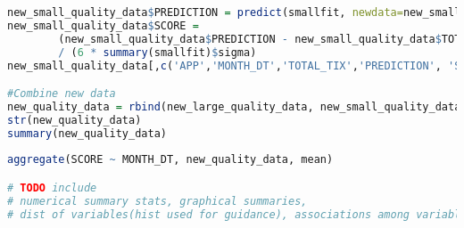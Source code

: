\documentclass[SDSUThesis.tex]{subfiles}
\begin{document}
{\begin{lstlisting}[language=R]
new_small_quality_data$PREDICTION = predict(smallfit, newdata=new_small_quality_data)
new_small_quality_data$SCORE = 
        (new_small_quality_data$PREDICTION - new_small_quality_data$TOTAL_TIX)
        / (6 * summary(smallfit)$sigma)
new_small_quality_data[,c('APP','MONTH_DT','TOTAL_TIX','PREDICTION', 'SCORE')]

#Combine new data  
new_quality_data = rbind(new_large_quality_data, new_small_quality_data)
str(new_quality_data)
summary(new_quality_data)
  
aggregate(SCORE ~ MONTH_DT, new_quality_data, mean)

# TODO include
# numerical summary stats, graphical summaries,
# dist of variables(hist used for guidance), associations among variables
\end{lstlisting}}
\end{document}
